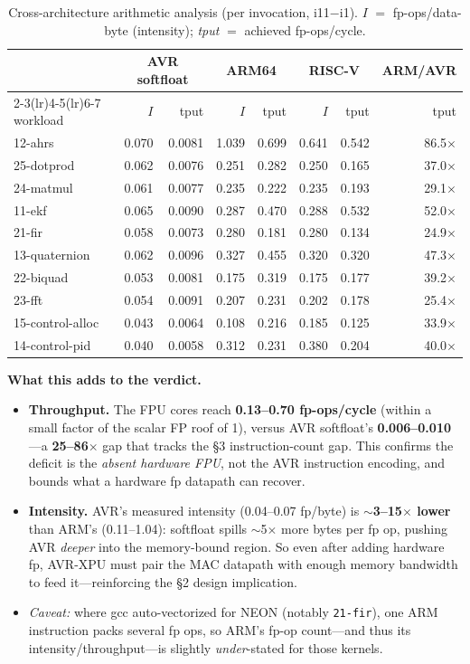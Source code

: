 \documentclass[11pt]{article}
\newcommand{\code}[1]{\texttt{#1}}
\begin{document}
\begin{table}[ht]\centering\small
\caption{Cross-architecture arithmetic analysis (per invocation, i11$-$i1).
$I$ $=$ fp-ops/data-byte (intensity); \emph{tput} $=$ achieved fp-ops/cycle.}\label{tab:xarch}
\begin{tabular}{@{}lrrrrrrr@{}}
\toprule
& \multicolumn{2}{c}{AVR softfloat} & \multicolumn{2}{c}{ARM64} & \multicolumn{2}{c}{RISC-V} & ARM/AVR \\
\cmidrule(lr){2-3}\cmidrule(lr){4-5}\cmidrule(lr){6-7}
workload & $I$ & tput & $I$ & tput & $I$ & tput & tput \\
\midrule
12-ahrs & 0.070 & 0.0081 & 1.039 & 0.699 & 0.641 & 0.542 & 86.5$\times$ \\
25-dotprod & 0.062 & 0.0076 & 0.251 & 0.282 & 0.250 & 0.165 & 37.0$\times$ \\
24-matmul & 0.061 & 0.0077 & 0.235 & 0.222 & 0.235 & 0.193 & 29.1$\times$ \\
11-ekf & 0.065 & 0.0090 & 0.287 & 0.470 & 0.288 & 0.532 & 52.0$\times$ \\
21-fir & 0.058 & 0.0073 & 0.280 & 0.181 & 0.280 & 0.134 & 24.9$\times$ \\
13-quaternion & 0.062 & 0.0096 & 0.327 & 0.455 & 0.320 & 0.320 & 47.3$\times$ \\
22-biquad & 0.053 & 0.0081 & 0.175 & 0.319 & 0.175 & 0.177 & 39.2$\times$ \\
23-fft & 0.054 & 0.0091 & 0.207 & 0.231 & 0.202 & 0.178 & 25.4$\times$ \\
15-control-alloc & 0.043 & 0.0064 & 0.108 & 0.216 & 0.185 & 0.125 & 33.9$\times$ \\
14-control-pid & 0.040 & 0.0058 & 0.312 & 0.231 & 0.380 & 0.204 & 40.0$\times$ \\
\bottomrule
\end{tabular}
\end{table}

\noindent\textbf{What this adds to the verdict.}
\begin{itemize}
  \item \textbf{Throughput.} The FPU cores reach \textbf{0.13--0.70 fp-ops/cycle} (within a small factor of
  the scalar FP roof of 1), versus AVR softfloat's \textbf{0.006--0.010}---a \textbf{25--86$\times$} gap
  that tracks the \S3 instruction-count gap. This confirms the deficit is the \emph{absent hardware FPU},
  not the AVR instruction encoding, and bounds what a hardware fp datapath can recover.
  \item \textbf{Intensity.} AVR's measured intensity (0.04--0.07 fp/byte) is \textbf{$\sim$3--15$\times$
  lower} than ARM's (0.11--1.04): softfloat spills $\sim$5$\times$ more bytes per fp op, pushing AVR
  \emph{deeper} into the memory-bound region. So even after adding hardware fp, AVR-XPU must pair the MAC
  datapath with enough memory bandwidth to feed it---reinforcing the \S2 design implication.
  \item \emph{Caveat:} where gcc auto-vectorized for NEON (notably \code{21-fir}), one ARM instruction
  packs several fp ops, so ARM's fp-op count---and thus its intensity/throughput---is slightly
  \emph{under}-stated for those kernels.
\end{itemize}
\end{document}
